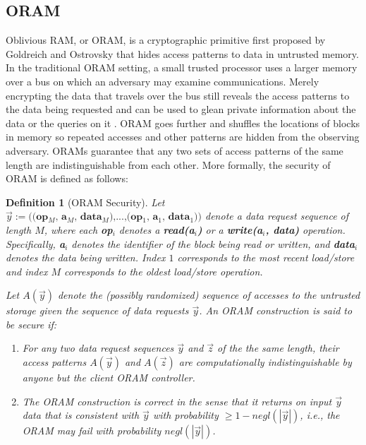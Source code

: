 \documentclass[USenglish,oneside,twocolumn]{article}
\newtheorem{definition}[theorem]{Definition}
\begin{document}
\subsection{ORAM}
Oblivious RAM, or ORAM, is a cryptographic primitive first proposed by Goldreich and Ostrovsky \cite{GO96} that hides access patterns to data in untrusted memory. In the traditional ORAM setting, a small trusted processor uses a larger memory over a bus on which an adversary may examine communications. Merely encrypting the data that travels over the bus still reveals the access patterns to the data being requested and can be used to glean private information about the data or the queries on it \cite{IKK12}. ORAM goes further and shuffles the locations of blocks in memory so repeated accesses and other patterns are hidden from the observing adversary. ORAMs guarantee that any two sets of access patterns of the same length are indistinguishable from each other. More formally, the security of ORAM is defined as follows:
\begin{definition}[ORAM Security\cite{SDS+13}]
Let $\overrightarrow{y}:=\textbf{((op$_M$, a$_M$, data$_M$),...,(op$_1$, a$_1$, data$_1$))}$ denote a data request sequence of length $M$, where each \textbf{op$_i$} denotes a \textbf{read(a$_i$)} or a \textbf{write(a$_i$, data)} operation. Specifically, \textbf{a$_i$} denotes the identifier of the block being read or written, and \textbf{data$_i$} denotes the data being written. Index $1$ corresponds to the most recent load/store and index $M$ corresponds to the oldest load/store operation. 

Let $A(\overrightarrow{y})$ denote the (possibly randomized) sequence of accesses to the untrusted storage given the sequence of data requests $\overrightarrow{y}$. An ORAM construction is said to be secure if:
\begin{enumerate}
\item For any two data request sequences $\overrightarrow{y}$ and $\overrightarrow{z}$ of the the same length, their access patterns $A(\overrightarrow{y})$ and $A(\overrightarrow{z})$ are computationally indistinguishable by anyone but the client ORAM controller.

\item The ORAM construction is correct in the sense that it returns on input $\overrightarrow{y}$ data that is consistent with $\overrightarrow{y}$ with probability $\geq 1 - \textit{negl}(|\overrightarrow{y}|)$, i.e., the ORAM may fail with probability $\textit{negl}(|\overrightarrow{y}|)$.
\end{enumerate}
\end{definition}
\end{document}
